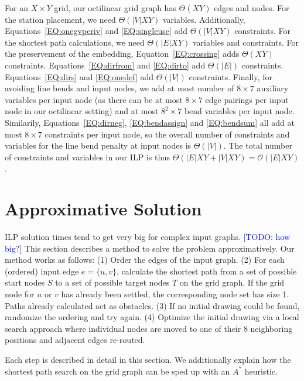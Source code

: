 \documentclass[sigconf]{acmart}
\newcommand\TODO[1]{\textcolor{blue}{\small [TODO: #1]}}
\begin{document}
For an $X \times Y$ grid, our octilinear grid graph has $\Theta(XY)$ edges and nodes.
For the station placement, we need ${\Theta}(|V|XY)$ variables.
Additionally, Equations~\ref{EQ:onegvperiv} and \ref{EQ:singleuse} add ${\Theta}(|V|XY)$ constraints.
For the shortest path calculations, we need ${\Theta}(|E|XY)$ variables and constraints.
For the preservement of the embedding, Equation~\ref{EQ:crossing} adds ${\Theta}(XY)$ constraints.
Equations~\ref{EQ:dirfrom} and \ref{EQ:dirto} add ${\Theta}(|E|)$ constraints.
Equations~\ref{EQ:dirs} and \ref{EQ:onedef} add ${\Theta}(|V|)$ constraints.
Finally, for avoiding line bends and input nodes, we add at most number of $8\times7$ auxiliary variables per input node (as there can be at most $8\times7$ edge pairings per input node in our octilinear setting) and at most $8^2\times7$ bend variables per input node.
Similarily, Equations~\ref{EQ:dirneg}, \ref{EQ:bendassign} and \ref{EQ:bendsum} all add at most $8\times7$ constraints per input node, so the overall number of constraints and variables for the line bend penalty at input nodes is ${\Theta}(|V|)$.
The total number of constraints and variables in our ILP is thus ${\Theta}(|E|XY + |V|XY) = \mathcal{O}(|E|XY)$.

\section{Approximative Solution}

ILP solution times tend to get very big for complex input graphs. \TODO{how big?}
This section describes a method to solve the problem approximatively.
Our method works as follows:
  (1) Order the edges of the input graph.
  (2) For each (ordered) input edge $e = \{u, v\}$, calculate the shortest path from a set of possible start nodes $S$ to a set of possible target nodes $T$ on the grid graph. If the grid node for $u$ or $v$ has already been settled, the corresponding node set has size 1. Paths already calculated act as obstacles.
  (3) If no initial drawing could be found, randomize the ordering and try again.
  (4) Optimize the initial drawing via a local search approach where individual nodes are moved to one of their 8 neighboring positions and adjacent edges re-routed.

Each step is described in detail in this section.
We additionally explain how the shortest path search on the grid graph can be sped up with an $A^*$ heuristic.
\end{document}
